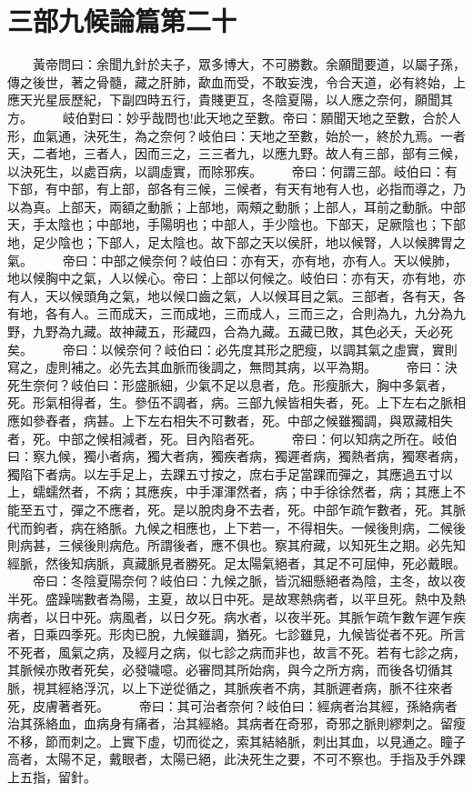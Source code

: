 \section{三部九候論篇第二十}

　　黃帝問曰：余聞九針於夫子，眾多博大，不可勝數。余願聞要道，以屬子孫，傳之後世，著之骨髓，藏之肝肺，歃血而受，不敢妄洩，令合天道，必有終始，上應天光星辰歷紀，下副四時五行，貴賤更互，冬陰夏陽，以人應之奈何，願聞其方。
　　岐伯對曰：妙乎哉問也!此天地之至數。帝曰：願聞天地之至數，合於人形，血氣通，決死生，為之奈何？岐伯曰：天地之至數，始於一，終於九焉。一者天，二者地，三者人，因而三之，三三者九，以應九野。故人有三部，部有三候，以決死生，以處百病，以調虛實，而除邪疾。
　　帝曰：何謂三部。岐伯曰：有下部，有中部，有上部，部各有三候，三候者，有天有地有人也，必指而導之，乃以為真。上部天，兩額之動脈；上部地，兩頰之動脈；上部人，耳前之動脈。中部天，手太陰也；中部地，手陽明也；中部人，手少陰也。下部天，足厥陰也；下部地，足少陰也；下部人，足太陰也。故下部之天以侯肝，地以候腎，人以候脾胃之氣。
　　帝曰：中部之候奈何？岐伯曰：亦有天，亦有地，亦有人。天以候肺，地以候胸中之氣，人以候心。帝曰：上部以何候之。岐伯曰：亦有天，亦有地，亦有人，天以候頭角之氣，地以候口齒之氣，人以候耳目之氣。三部者，各有天，各有地，各有人。三而成天，三而成地，三而成人，三而三之，合則為九，九分為九野，九野為九藏。故神藏五，形藏四，合為九藏。五藏已敗，其色必夭，夭必死矣。
　　帝曰：以候奈何？岐伯曰：必先度其形之肥瘦，以調其氣之虛實，實則寫之，虛則補之。必先去其血脈而後調之，無問其病，以平為期。
　　帝曰：決死生奈何？岐伯曰：形盛脈細，少氣不足以息者，危。形瘦脈大，胸中多氣者，死。形氣相得者，生。參伍不調者，病。三部九候皆相失者，死。上下左右之脈相應如參舂者，病甚。上下左右相失不可數者，死。中部之候雖獨調，與眾藏相失者，死。中部之候相減者，死。目內陷者死。
　　帝曰：何以知病之所在。岐伯曰：察九候，獨小者病，獨大者病，獨疾者病，獨遲者病，獨熱者病，獨寒者病，獨陷下者病。以左手足上，去踝五寸按之，庶右手足當踝而彈之，其應過五寸以上，蠕蠕然者，不病；其應疾，中手渾渾然者，病；中手徐徐然者，病；其應上不能至五寸，彈之不應者，死。是以脫肉身不去者，死。中部乍疏乍數者，死。其脈代而鉤者，病在絡脈。九候之相應也，上下若一，不得相失。一候後則病，二候後則病甚，三候後則病危。所謂後者，應不俱也。察其府藏，以知死生之期。必先知經脈，然後知病脈，真藏脈見者勝死。足太陽氣絕者，其足不可屈伸，死必戴眼。
　　帝曰：冬陰夏陽奈何？岐伯曰：九候之脈，皆沉細懸絕者為陰，主冬，故以夜半死。盛躁喘數者為陽，主夏，故以日中死。是故寒熱病者，以平旦死。熱中及熱病者，以日中死。病風者，以日夕死。病水者，以夜半死。其脈乍疏乍數乍遲乍疾者，日乘四季死。形肉已脫，九候雖調，猶死。七診雖見，九候皆從者不死。所言不死者，風氣之病，及經月之病，似七診之病而非也，故言不死。若有七診之病，其脈候亦敗者死矣，必發噦噫。必審問其所始病，與今之所方病，而後各切循其脈，視其經絡浮沉，以上下逆從循之，其脈疾者不病，其脈遲者病，脈不往來者死，皮膚著者死。
　　帝曰：其可治者奈何？岐伯曰：經病者治其經，孫絡病者治其孫絡血，血病身有痛者，治其經絡。其病者在奇邪，奇邪之脈則繆刺之。留瘦不移，節而刺之。上實下虛，切而從之，索其結絡脈，刺出其血，以見通之。瞳子高者，太陽不足，戴眼者，太陽已絕，此決死生之要，不可不察也。手指及手外踝上五指，留針。


